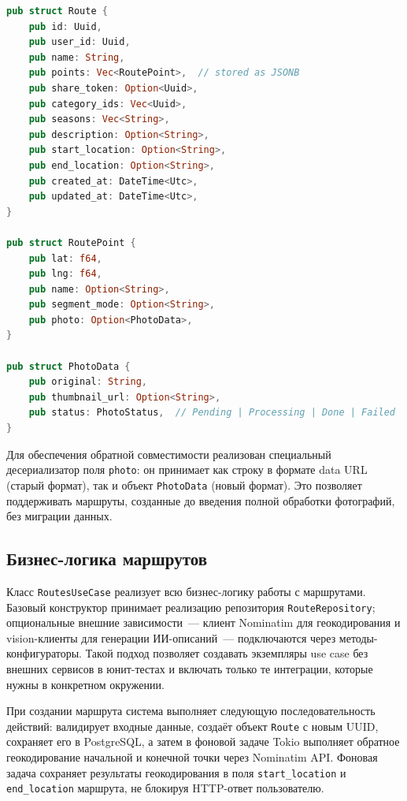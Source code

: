 \begin{lstlisting}[language=Rust, caption={Доменные модели Route и RoutePoint}, label={lst:domain-route}]
pub struct Route {
    pub id: Uuid,
    pub user_id: Uuid,
    pub name: String,
    pub points: Vec<RoutePoint>,  // stored as JSONB
    pub share_token: Option<Uuid>,
    pub category_ids: Vec<Uuid>,
    pub seasons: Vec<String>,
    pub description: Option<String>,
    pub start_location: Option<String>,
    pub end_location: Option<String>,
    pub created_at: DateTime<Utc>,
    pub updated_at: DateTime<Utc>,
}

pub struct RoutePoint {
    pub lat: f64,
    pub lng: f64,
    pub name: Option<String>,
    pub segment_mode: Option<String>,
    pub photo: Option<PhotoData>,
}

pub struct PhotoData {
    pub original: String,
    pub thumbnail_url: Option<String>,
    pub status: PhotoStatus,  // Pending | Processing | Done | Failed
}
\end{lstlisting}

Для обеспечения обратной совместимости реализован специальный десериализатор поля \texttt{photo}: он принимает как строку в формате data URL (старый формат), так и объект \texttt{PhotoData} (новый формат). Это позволяет поддерживать маршруты, созданные до введения полной обработки фотографий, без миграции данных.

\subsection{Бизнес-логика маршрутов}

Класс \texttt{RoutesUseCase} реализует всю бизнес-логику работы с маршрутами.
Базовый конструктор принимает реализацию репозитория
\texttt{RouteRepository}; опциональные внешние зависимости~--- клиент Nominatim
для геокодирования и vision-клиенты для генерации ИИ-описаний~--- подключаются
через методы-конфигураторы. Такой подход позволяет создавать экземпляры use case
без внешних сервисов в юнит-тестах и включать только те интеграции, которые
нужны в конкретном окружении.

При создании маршрута система выполняет следующую последовательность действий: валидирует входные данные, создаёт объект \texttt{Route} с новым UUID, сохраняет его в PostgreSQL, а затем в фоновой задаче Tokio выполняет обратное геокодирование начальной и конечной точки через Nominatim API. Фоновая задача сохраняет результаты геокодирования в поля \texttt{start\_location} и \texttt{end\_location} маршрута, не блокируя HTTP-ответ пользователю.

